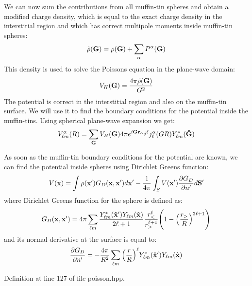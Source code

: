 We can now sum the contributions from all muffin-\/tin spheres and obtain a modified charge density, which is equal to the exact charge density in the interstitial region and which has correct multipole moments inside muffin-\/tin spheres\+: \[ \tilde \rho({\bf G}) = \rho({\bf G}) + \sum_{\alpha} P^{\alpha}({\bf G}) \] This density is used to solve the Poisson\textquotesingle{}s equation in the plane-\/wave domain\+: \[ V_{H}({\bf G}) = \frac{4 \pi \tilde \rho({\bf G})}{G^2} \] The potential is correct in the interstitial region and also on the muffin-\/tin surface. We will use it to find the boundary conditions for the potential inside the muffin-\/tins. Using spherical plane-\/wave expansion we get\+: \[ V^{\alpha}_{\ell m}(R) = \sum_{\bf G} V_{H}({\bf G}) 4\pi e^{i{\bf G r}_{\alpha}} i^\ell j_{\ell}^{\alpha}(GR) Y_{\ell m}^{*}({\bf \hat G}) \]

As soon as the muffin-\/tin boundary conditions for the potential are known, we can find the potential inside spheres using Dirichlet Green\textquotesingle{}s function\+: \[ V({\bf x}) = \int \rho({\bf x'})G_D({\bf x},{\bf x'}) d{\bf x'} - \frac{1}{4 \pi} \int_{S} V({\bf x'}) \frac{\partial G_D}{\partial n'} d{\bf S'} \] where Dirichlet Green\textquotesingle{}s function for the sphere is defined as\+: \[ G_D({\bf x},{\bf x'}) = 4\pi \sum_{\ell m} \frac{Y_{\ell m}^{*}({\bf \hat x'}) Y_{\ell m}(\hat {\bf x})}{2\ell + 1} \frac{r_{<}^{\ell}}{r_{>}^{\ell+1}}\Biggl(1 - \Big( \frac{r_{>}}{R} \Big)^{2\ell + 1} \Biggr) \] and it\textquotesingle{}s normal derivative at the surface is equal to\+: \[ \frac{\partial G_D}{\partial n'} = -\frac{4 \pi}{R^2} \sum_{\ell m} \Big( \frac{r}{R} \Big)^{\ell} Y_{\ell m}^{*}({\bf \hat x'}) Y_{\ell m}(\hat {\bf x}) \] 

Definition at line 127 of file poisson.\+hpp.

\hypertarget{classsirius_1_1_potential_a1abe0a0486f01331b8baf7a359523ae6}{}
